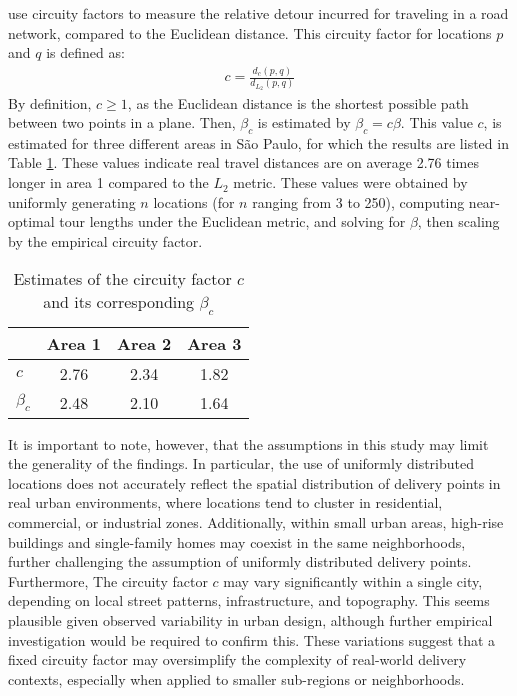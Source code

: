 \citet{merchan2019empirical} use circuity factors to measure the relative detour incurred for
traveling in a road network, compared to the Euclidean distance. This circuity factor for locations $p$ and $q$ is defined as:
\begin{align}
	c = \frac{d_{c}(p,q)}{d_{L_{2}}(p,q)}
	\label{eq:circuity}
\end{align}
By definition, $c \geq 1$, as the Euclidean distance is the shortest possible path between two points in a plane.
Then, $\beta_c$ is estimated by $\beta_c=c\beta$. This value $c$, is estimated for three different areas in
São Paulo, for which the results are listed in Table \ref{tab:beta-merchan}. These values indicate
real travel distances are on average 2.76 times longer in area 1 compared to the $L_2$ metric.
These values were obtained by uniformly generating $n$ locations (for $n$ ranging from 3 to 250),
computing near-optimal tour lengths under the Euclidean metric, and solving for $\beta$, then
scaling by the empirical circuity factor.
\begin{table}[H]
	\centering
	\caption{Estimates of the circuity factor $c$ and its corresponding $\beta_c$ \citep{merchan2019empirical}}
	\label{tab:beta-merchan}
	\begin{tabular}{lccc}
		\toprule
		          & Area 1 & Area 2 & Area 3 \\
		\midrule
		$c$       & 2.76   & 2.34   & 1.82   \\
		$\beta_c$ & 2.48   & 2.10   & 1.64   \\
		\bottomrule
	\end{tabular}
\end{table}
It is important to note, however, that the assumptions in this study may limit the generality of
the findings. In particular, the use of uniformly distributed locations does not accurately reflect
the spatial distribution of delivery points in real urban environments, where locations tend to
cluster in residential, commercial, or industrial zones. Additionally, within small urban areas,
high-rise buildings and single-family homes may coexist in the same neighborhoods, further
challenging the assumption of uniformly distributed delivery points.
Furthermore, The circuity factor $c$ may vary significantly within a single city, depending on local
street patterns, infrastructure, and topography. This seems plausible given observed variability in urban
design, although further empirical investigation would be required to confirm this. These variations
suggest that a fixed circuity factor may oversimplify the complexity of real-world delivery contexts,
especially when applied to smaller sub-regions or neighborhoods.
